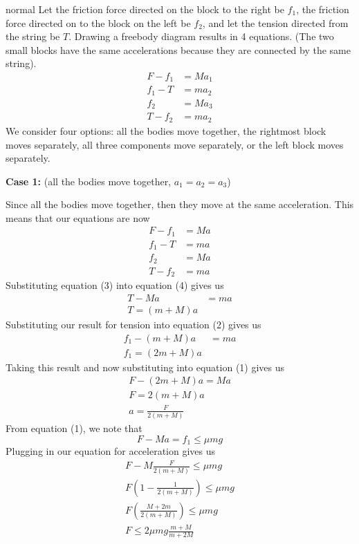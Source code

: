 \begin{solution}{normal}
Let the friction force directed on the block to the right be $f_1$, the friction force directed on to the block on the left be $f_2$, and let the tension directed from the string be $T$. Drawing a freebody diagram results in 4 equations. (The two small blocks have the same accelerations because they are connected by the same string).
\begin{align}
F - f_1 &= Ma_1\\
f_1 - T &= ma_2\\
f_2 &= Ma_3\\
T - f_2 &= ma_2
\end{align}
We consider four options: all the bodies move together, the rightmost block moves separately, all three components move separately, or the left block moves separately.
\vspace{2mm}

\textbf{Case 1:} (all the bodies move together, $a_1 = a_2 = a_3$)
\vspace{2mm}

Since all the bodies move together, then they move at the same acceleration. This means that our equations are now
\begin{align}
F - f_1 &= Ma\\
f_1 - T &= ma\\
f_2 &= Ma\\
T - f_2 &= ma
\end{align}
Substituting equation (3) into equation (4) gives us 
\begin{align*}
T - Ma &= ma\\
T = (m + M)a
\end{align*}
Substituting our result for tension into equation (2) gives us 
\begin{align*}
f_1 - (m + M)a &= ma\\
f_1 = (2m + M)a
\end{align*}
Taking this result and now substituting into equation (1) gives us 
\begin{align*}
F - (2m + M)a = Ma\\
F = 2(m + M)a\\
\boxed{a = \frac{F}{2(m + M)}}
\end{align*}
From equation (1), we note that 
\[F - Ma = f_1 \leq\mu mg\]
Plugging in our equation for acceleration gives us 
\begin{align*}
F - M \frac{F}{2(m + M)} \leq \mu mg\\
F\left(1 - \frac{1}{2(m + M)}\right) \leq \mu mg\\
F\left(\frac{M + 2m}{2(m + M)}\right) \leq \mu mg\\
\boxed{F \leq 2\mu mg \frac{m +M}{m + 2M}}
\end{align*}


\end{solution}
